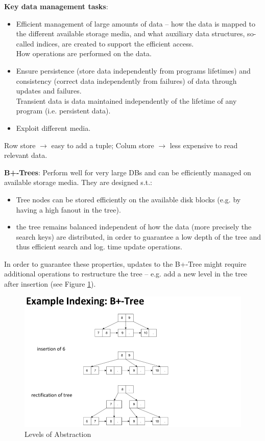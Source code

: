 \textbf{Key data management tasks}:
\begin{itemize}
	\item Efficient management of large amounts of data -- how the data is mapped to
	the different available storage media, and what auxiliary data
	structures, so-called indices, are created to support the efficient
	access.\\
	How operations are performed on the data.
	\item Ensure persistence (store data independently from programs lifetimes) and consistency (correct data independently from failures) of data through updates and failures.\\
	Transient data is data maintained independently of the lifetime of any program (i.e. persistent data).
	\item Exploit different media.
\end{itemize}

Row store $\rightarrow$ easy to add a tuple; Colum store $\rightarrow$ less expensive to read relevant data.

\textbf{B+-Trees}: Perform well for very large DBs and can be efficiently
managed on available storage media. They are designed s.t.:
\begin{itemize}
	\item Tree nodes can be stored efficiently on the available disk blocks (e.g. by having a high fanout in the tree).
	\item the tree remains balanced independent of how the data (more precisely the search keys) are distributed, in order to guarantee a low depth of the tree and thus efficient search and log. time update operations.
\end{itemize}
In order to guarantee these properties,
updates to the B+-Tree might require additional operations to
restructure the tree -- e.g. add a new level in the tree after insertion (see Figure \ref{fig:ch1tree1}).
    \begin{figure}[htp]
      \centering
        \includegraphics[width=\textwidth]{images/ch1tree1.png}
        \caption{Levels of Abstraction}
        \label{fig:ch1tree1}
    \end{figure}

